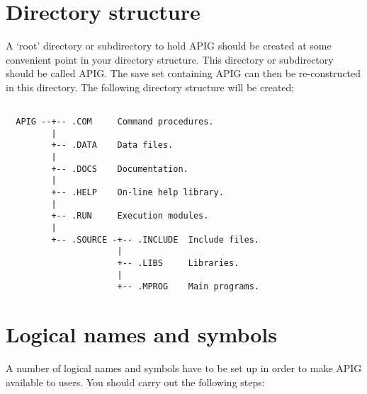 \section{Directory structure}

A `root' directory or subdirectory to hold APIG should be created at
some convenient point in your directory structure. This directory or
subdirectory should be called APIG. The save set containing APIG can
then be re-constructed in this directory. The following directory
structure will be created;

\nopagebreak
\begin{verbatim}

  APIG --+-- .COM     Command procedures.
         |
         +-- .DATA    Data files.
         |
         +-- .DOCS    Documentation.
         |
         +-- .HELP    On-line help library.
         |
         +-- .RUN     Execution modules.
         |
         +-- .SOURCE -+-- .INCLUDE  Include files.
                      |
                      +-- .LIBS     Libraries.
                      |
                      +-- .MPROG    Main programs.

\end{verbatim}

\section{Logical names and symbols}

A number of logical names and symbols have to be set up in order to make
APIG available to users. You should carry out the following steps:

